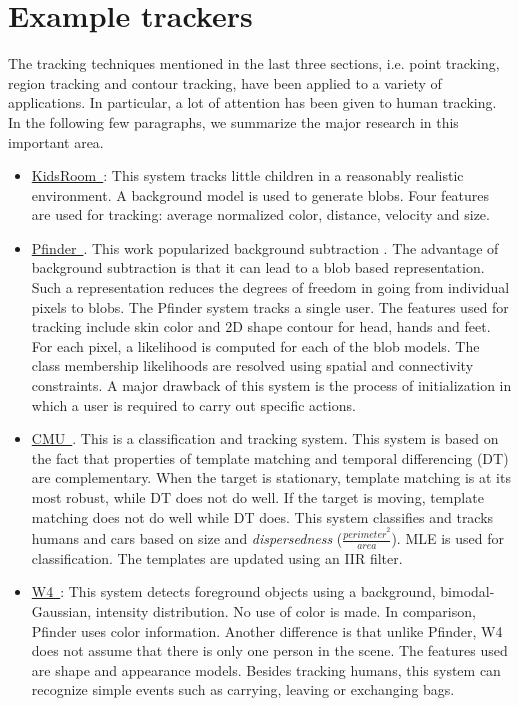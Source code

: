 \section{Example trackers}
The tracking techniques mentioned in the last three sections, i.e. point tracking, region tracking and contour tracking, have been applied to a variety of applications.  In particular, a lot of attention has been given to human tracking.  In the following few paragraphs, we summarize the major research in this important area.


\begin{itemize}
\item \underline{KidsRoom~\cite{1997_CNF_ClosedWorldTracking_Intille}}:  This system tracks little children in a reasonably realistic environment.  A background model is used to generate blobs.  Four features are used for tracking: average normalized color, distance, velocity and size.  

\item \underline{Pfinder~\cite{1997_JNL_Pfinder_Wren}}.  This work popularized background subtraction \cite{2006_JNL_SURVEYtrk_Yilmaz}.  The advantage of background subtraction is that it can lead to a blob based representation.  Such a representation reduces the degrees of freedom in going from individual pixels to blobs.  The Pfinder system tracks a single user.  The features used for tracking include skin color and 2D shape contour for head, hands and feet.  For each pixel, a likelihood is computed for each of the blob models.  The class membership likelihoods are resolved using spatial and connectivity constraints.  A major drawback of this system is the process of initialization in which a user is required to carry out specific actions.

\item \underline{CMU~\cite{1998_CNF_Tracking_Lipton}}.  This is a classification and tracking system.  This system is based on the fact that properties of template matching and temporal differencing (DT) are complementary.  When the target is stationary, template matching is at its most robust, while DT does not do well.  If the target is moving, template matching does not do well while DT does.  This system classifies and tracks humans and cars based on size and \emph{dispersedness} ($\frac{{perimeter}^2}{area}$).  MLE is used for classification.  The templates are updated using an IIR filter.

\item \underline{W4~\cite{2000_JNL_W4_Haritaoglu}}:  This system detects foreground objects using a background, bimodal-Gaussian, intensity distribution.  No use of color is made.  In comparison, Pfinder uses color information.  Another difference is that unlike Pfinder, W4 does not assume that there is only one person in the scene.  The features used are shape and appearance models.  Besides tracking humans, this system can recognize simple events such as carrying, leaving or exchanging bags.


\end{itemize}

